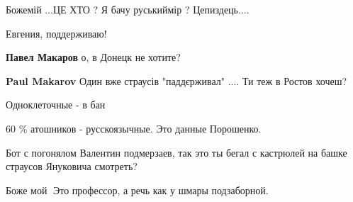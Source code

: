 \begin{itemize}
 
Божемій ...ЦЕ ХТО ? Я бачу руськиймір ? Цепиздець....

 
Евгения, поддерживаю!

\begin{itemize}
 
\textbf{Павел Макаров} о, в Донецк не хотите?

 
\textbf{Paul Makarov} Один вже страусів "паддєрживал" ....
Ти теж в Ростов хочеш?

 
Одноклеточные - в бан

 
60 \% атошников - русскоязычные. Это данные Порошенко.

 
Бот с погонялом Валентин подмерзаев, так это ты бегал с кастрюлей на башке страусов Януковича смотреть?
\end{itemize}

 

Боже мой🤦 Это профессор, а речь как у шмары подзаборной.

\begin{itemize}
 

\end{itemize}
\end{itemize}
